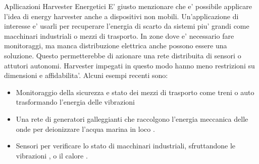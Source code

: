 \begin{multicols}{2}
\begin{section}{Apllicazioni Harvester Energetici}
    E' giusto menzionare che e' possibile applicare l'idea di energy harvester anche a dispositivi non mobili. Un'applicazione di interesse e' usarli per recuperare l'energia di scarto da sistemi piu' grandi come macchinari industriali o mezzi di trasporto. In zone dove e' necessario fare monitoraggi, ma manca distribuzione elettrica anche possono essere una soluzione. Questo permetterebbe di azionare una rete distribuita di sensori o attutori autonomi. Harvester impegati in questo modo hanno meno restrizioni su dimensioni e affidabilita'. Alcuni esempi recenti sono: \begin{itemize}
        \item Monitoraggio della sicurezza e stato dei mezzi di trasporto come treni o auto trasformando l'energia delle vibrazioni \cite{liSmartRailwayTransportation, liuCompactHybridizedTriboelectricelectromagnetic2024}
        \item Una rete di generatori galleggianti che raccolgono l'energia meccanica delle onde per deionizzare l'acqua marina in loco \cite{renWavepoweredCapacitiveDeionization2024}. 
        \item Sensori per verificare lo stato di macchinari industriali, sfruttandone le vibrazioni \cite{alvarezruedaVibrationEnergyHarvesting2024, gaoHybridGeneratorEfficient2024}, o il calore \cite{deoliveiraDevelopmentHybridEnergy2024}.
    \end{itemize}
    
\end{section}



\end{multicols}